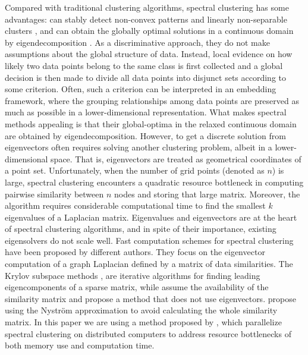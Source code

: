 \documentclass[12pt,letterpaper]{article}
\begin{document}
Compared with traditional clustering algorithms, spectral clustering has some advantages: can stably detect 
non-convex patterns and linearly non-separable clusters \citep{Sakai2009}, and can obtain the globally optimal 
solutions in a continuous domain by eigendecomposition  \citep{Archip2005}. As a discriminative approach, they 
do not make assumptions about the global structure of data. 
Instead, local evidence on how likely two data points belong to the same class is first collected and a global decision 
is then made to divide all data points into disjunct sets according to some criterion. Often, such a criterion can be
interpreted in an embedding framework, where the grouping relationships among data points are preserved as much
as possible in a lower-dimensional representation. What makes spectral methods appealing is that their global-optima 
in the relaxed continuous domain are obtained by eigendecomposition. However, to get a discrete solution from eigenvectors
often requires solving another clustering problem, albeit in a lower-dimensional space. That is, eigenvectors are treated as 
geometrical coordinates of a point set. Unfortunately, when the number of grid points (denoted as $n$) is large, spectral 
clustering encounters a quadratic resource bottleneck in computing pairwise similarity between $n$ nodes and storing 
that large matrix. Moreover, the algorithm requires considerable computational time to find the smallest $k$ eigenvalues of 
a Laplacian matrix. Eigenvalues and eigenvectors are at the heart of spectral clustering algorithms, and in spite of their 
importance, existing eigensolvers do not scale well. Fast computation schemes for spectral clustering have been proposed 
by  different authors. They focus on the eigenvector computation of a graph Laplacian defined by a matrix of data similarities.
The Krylov subspace methods \citep{Mahadevan2008}, are iterative algorithms for finding leading eigencomponents of a sparse 
matrix, while \cite{Dhillon2007} assume the availability of the similarity matrix and propose a method that does not use eigenvectors.
\cite{Fowlkes2004} propose using the Nystr\"{o}m approximation to avoid calculating the whole similarity matrix. In this paper we are 
using a method proposed by \cite{Song2008}, which parallelize spectral clustering on distributed computers to address
resource bottlenecks of both memory use and computation time.
\end{document}

